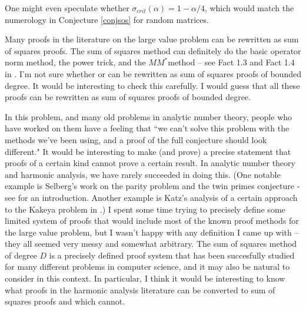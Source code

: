 \documentclass{amsart}
\begin{document}
One might even speculate whether $\sigma_{crit}(\alpha) = 1 - \alpha/4$,  which would match the numerology in Conjecture \ref{conjsos} for random matrices.

Many proofs in the literature on the large value problem can be rewritten as sum of squares proofs.   The sum of squares method can definitely do the basic operator norm method,  the power trick, and the $M M^*$method -- see Fact 1.3 and Fact 1.4 in \cite{DHPT}.   I'm not sure whether \cite{HB} or \cite{GM} can be rewritten as sum of squares proofs of bounded degree.   It would be interesting to check this carefully.  I would guess that all these proofs can be rewritten as sum of squares proofs of bounded degree.

In this problem, and many old problems in analytic number theory,  people who have worked on them have a feeling that ``we can't solve this problem with the methods we've been using,  and a proof of the full conjecture should look different."  It would be interesting to make (and prove) a precise statement that proofs of a certain kind cannot prove a certain result.   In analytic number theory and harmonic analysis,  we have rarely succeeded in doing this.  (One notable example is Selberg's work on the parity problem and the twin primes conjecture - see \cite{T2} for an introduction.   Another example is Katz's analysis of a certain approach to the Kakeya problem in \cite{K}.)  I spent some time trying to precisely define some limited system of proofs that would include most of the known proof methods for the large value problem,  but I wasn't happy with any definition I came up with -- they all seemed very messy and somewhat arbitrary.   The sum of squares method of degree $D$ is a precisely defined proof system that has been succesfully studied for many different problems in computer science,  and it may also be natural to consider in this context.   In particular,  I think it would be interesting to know what proofs in the harmonic analysis literature can be converted to sum of squares proofs and which cannot. 
\end{document}
